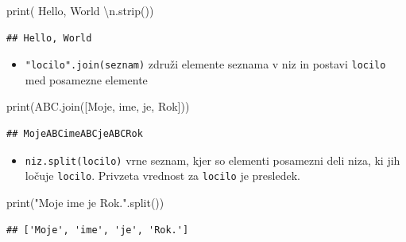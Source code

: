 \documentclass[
]{book}
\newenvironment{Shaded}{\begin{snugshade}}{\end{snugshade}}
\newcommand{\BuiltInTok}[1]{#1}
\newcommand{\CharTok}[1]{\textcolor[rgb]{0.31,0.60,0.02}{#1}}
\newcommand{\NormalTok}[1]{#1}
\newcommand{\StringTok}[1]{\textcolor[rgb]{0.31,0.60,0.02}{#1}}
\providecommand{\tightlist}{%
  \setlength{\itemsep}{0pt}\setlength{\parskip}{0pt}}
\begin{document}
\begin{Shaded}
\begin{Highlighting}[]
\BuiltInTok{print}\NormalTok{(}\StringTok{\textquotesingle{}    Hello, World    }\CharTok{\textbackslash{}n}\StringTok{\textquotesingle{}}\NormalTok{.strip())}
\end{Highlighting}
\end{Shaded}

\begin{verbatim}
## Hello, World
\end{verbatim}

\begin{itemize}
\tightlist
\item
  \texttt{"locilo".join(seznam)} združi elemente seznama v niz in postavi \texttt{locilo}
  med posamezne elemente
\end{itemize}

\begin{Shaded}
\begin{Highlighting}[]
\BuiltInTok{print}\NormalTok{(}\StringTok{\textquotesingle{}ABC\textquotesingle{}}\NormalTok{.join([}\StringTok{\textquotesingle{}Moje\textquotesingle{}}\NormalTok{, }\StringTok{\textquotesingle{}ime\textquotesingle{}}\NormalTok{, }\StringTok{\textquotesingle{}je\textquotesingle{}}\NormalTok{, }\StringTok{\textquotesingle{}Rok\textquotesingle{}}\NormalTok{]))}
\end{Highlighting}
\end{Shaded}

\begin{verbatim}
## MojeABCimeABCjeABCRok
\end{verbatim}

\begin{itemize}
\tightlist
\item
  \texttt{niz.split(locilo)} vrne seznam, kjer so elementi posamezni deli niza, ki jih
  ločuje \texttt{locilo}. Privzeta vrednost za \texttt{locilo} je presledek.
\end{itemize}

\begin{Shaded}
\begin{Highlighting}[]
\BuiltInTok{print}\NormalTok{(}\StringTok{"Moje ime je Rok."}\NormalTok{.split())}
\end{Highlighting}
\end{Shaded}

\begin{verbatim}
## ['Moje', 'ime', 'je', 'Rok.']
\end{verbatim}
\end{document}
